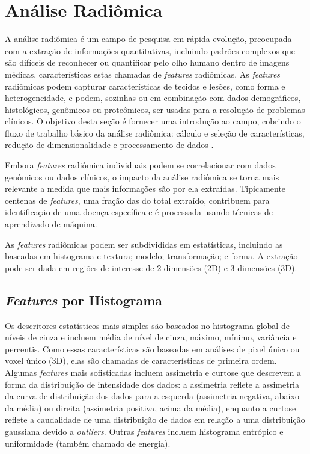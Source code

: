 \section{Análise Radiômica}

A análise radiômica é um campo de pesquisa em rápida evolução, preocupada com a extração de informações quantitativas, incluindo padrões complexos que são difíceis de reconhecer ou quantificar pelo olho humano dentro de imagens médicas, características estas chamadas de \textit{features} radiômicas. As \textit{features} radiômicas podem capturar características de tecidos e lesões, como forma e heterogeneidade, e podem, sozinhas ou em combinação com dados demográficos, histológicos, genômicos ou proteômicos, ser usadas para a resolução de problemas clínicos. O objetivo desta seção é fornecer uma introdução ao campo, cobrindo o fluxo de trabalho básico da análise radiômica: cálculo e seleção de características, redução de dimensionalidade e processamento de dados \cite{mayerhoeferIntroductionRadiomics2020}.

Embora \textit{features} radiômica individuais podem se correlacionar com dados genômicos ou dados clínicos, o impacto da análise radiômica se torna mais relevante a medida que mais informações são por ela extraídas. Tipicamente centenas de \textit{features}, uma fração das do total extraído, contribuem para identificação de uma doença específica e é processada usando técnicas de aprendizado de máquina.

As \textit{features} radiômicas podem ser subdivididas em estatísticas, incluindo as baseadas em histograma e textura; modelo; transformação; e forma. A extração pode ser dada em regiões de interesse de 2-dimensões (2D) e 3-dimensões (3D).

\subsection{\textit{Features} por Histograma}

Os descritores estatísticos mais simples são baseados no histograma global de níveis de cinza e incluem média de nível de cinza, máximo, mínimo, variância e percentis. Como essas características são baseadas em análises de pixel único ou voxel único (3D), elas são chamadas de características de primeira ordem. Algumas \textit{features} mais sofisticadas incluem assimetria e curtose que descrevem a forma da distribuição de intensidade dos dados: a assimetria reflete a assimetria da curva de distribuição dos dados para a esquerda (assimetria negativa, abaixo da média) ou direita (assimetria positiva, acima da média), enquanto a curtose reflete a caudalidade de uma distribuição de dados em relação a uma distribuição gaussiana devido a \textit{outliers}. Outras \textit{features} incluem histograma entrópico e uniformidade (também chamado de energia).

